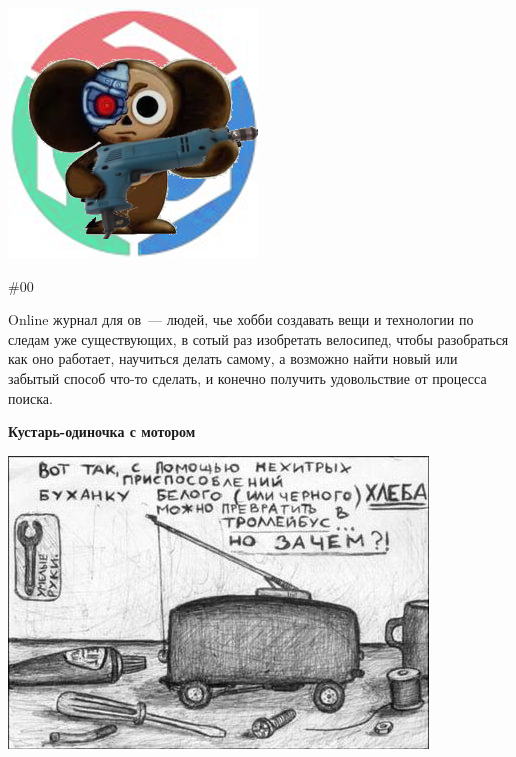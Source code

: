 \documentclass{magazine}
\begin{document}
\begin{titlepage}

\begin{multicols}{2}

\noindent\includegraphics[width=0.9\columnwidth]{logo/chbz.png}

\columnbreak

{\Huge \Scr \#00}\bigskip

\noindent\textsf{
Online журнал для \scr ов\ --- людей, чье хобби создавать вещи и технологии по
следам уже существующих, в сотый раз изобретать велосипед, чтобы разобраться как
оно работает, научиться делать самому, а возможно найти новый или забытый способ
что-то сделать, и конечно получить удовольствие от процесса поиска.}

\end{multicols}

\begin{center}
{\Huge\textbf{Кустарь-одиночка с мотором}}
{\large\bigskip}
\end{center}

\noindent\includegraphics[width=\textwidth]{logo/trolley.jpg}


\end{titlepage}
\end{document}
